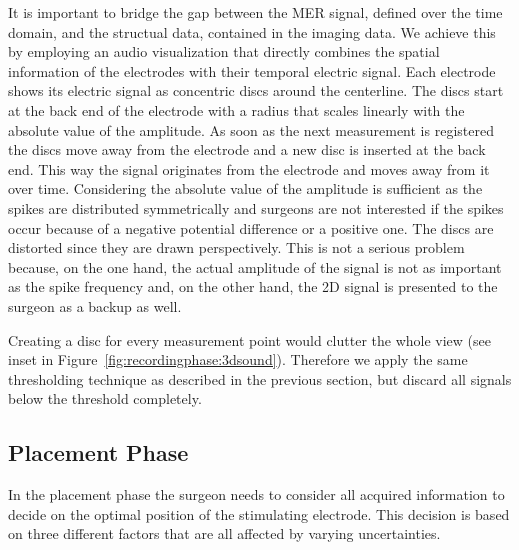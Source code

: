 \documentclass[review]{vgtc}                 %
\begin{document}
It is important to bridge the gap between the MER signal, defined over the time domain, and the structual data, contained in the imaging data. We achieve this by employing an audio visualization that directly combines the spatial information of the electrodes with their temporal electric signal. Each electrode shows its electric signal as concentric discs around the centerline. The discs start at the back end of the electrode with a radius that scales linearly with the absolute value of the amplitude. As soon as the next measurement is registered the discs move away from the electrode and a new disc is inserted at the back end. This way the signal originates from the electrode and moves away from it over time. Considering the absolute value of the amplitude is sufficient as the spikes are distributed symmetrically and surgeons are not interested if the spikes occur because of a negative potential difference or a positive one. The discs are distorted since they are drawn perspectively. This is not a serious problem because, on the one hand, the actual amplitude of the signal is not as important as the spike frequency and, on the other hand, the 2D signal is presented to the surgeon as a backup as well.

Creating a disc for every measurement point would clutter the whole view (see inset in Figure~\ref{fig:recordingphase:3dsound}). Therefore we apply the same thresholding technique as described in the previous section, but discard all signals below the threshold completely.


\subsection{Placement Phase}\label{sec:overview:placement}
In the placement phase the surgeon needs to consider all acquired information to decide on the optimal position of the stimulating electrode. This decision is based on three different factors that are all affected by varying uncertainties.
\end{document}
